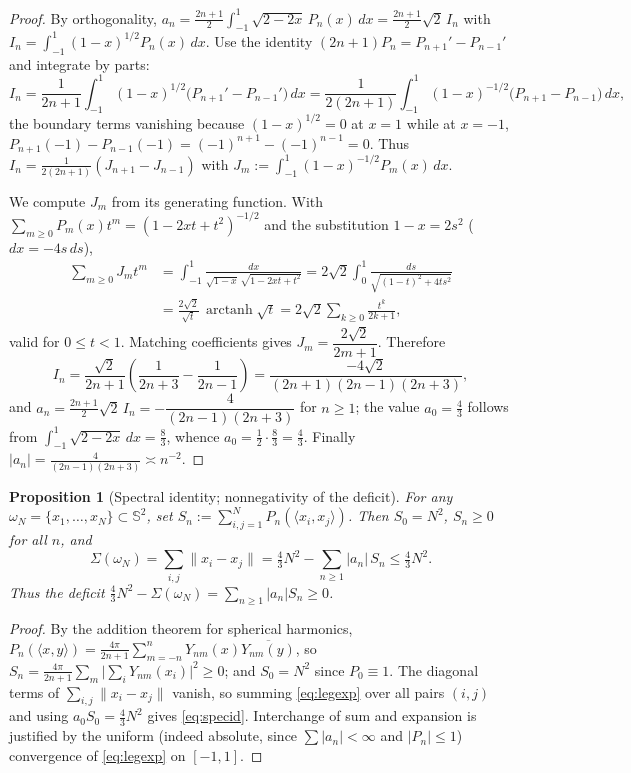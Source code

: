 \documentclass[11pt,reqno]{amsart}
\newtheorem{proposition}[theorem]{Proposition}
\theoremstyle{definition}
\newcommand{\Sph}{\mathbb{S}^2}
\newcommand{\Leg}{P}                      %
\newcommand{\dist}[2]{\lVert #1-#2\rVert}
\newcommand{\inner}[2]{\langle #1,#2\rangle}
\newcommand{\ol}{\overline}
\newcommand{\abs}[1]{\lvert #1\rvert}
\begin{document}
\begin{proof}
By orthogonality, $a_n=\frac{2n+1}{2}\int_{-1}^1\sqrt{2-2x}\,\Leg_n(x)\,dx=\frac{2n+1}{2}\sqrt2\,I_n$
with $I_n=\int_{-1}^1(1-x)^{1/2}\Leg_n(x)\,dx$. Use the identity
$(2n+1)\Leg_n=\Leg_{n+1}'-\Leg_{n-1}'$ and integrate by parts:
\[
   I_n=\frac{1}{2n+1}\int_{-1}^1(1-x)^{1/2}\bigl(\Leg_{n+1}'-\Leg_{n-1}'\bigr)\,dx
      =\frac{1}{2(2n+1)}\int_{-1}^1(1-x)^{-1/2}\bigl(\Leg_{n+1}-\Leg_{n-1}\bigr)\,dx,
\]
the boundary terms vanishing because $(1-x)^{1/2}=0$ at $x=1$ while at $x=-1$,
$\Leg_{n+1}(-1)-\Leg_{n-1}(-1)=(-1)^{n+1}-(-1)^{n-1}=0$. Thus $I_n=\frac{1}{2(2n+1)}(J_{n+1}-J_{n-1})$
with $J_m:=\int_{-1}^1(1-x)^{-1/2}\Leg_m(x)\,dx$.

We compute $J_m$ from its generating function. With $\sum_{m\ge0}\Leg_m(x)t^m=(1-2xt+t^2)^{-1/2}$
and the substitution $1-x=2s^2$ ($dx=-4s\,ds$),
\begin{align*}
   \sum_{m\ge0}J_m t^m
   &=\int_{-1}^1\frac{dx}{\sqrt{1-x}\,\sqrt{1-2xt+t^2}}
    =2\sqrt2\int_0^1\frac{ds}{\sqrt{(1-t)^2+4ts^2}}\\
   &=\frac{2\sqrt2}{\sqrt t}\,\operatorname{arctanh}\!\sqrt t
    =2\sqrt2\sum_{k\ge0}\frac{t^k}{2k+1},
\end{align*}
valid for $0\le t<1$. Matching coefficients gives $J_m=\dfrac{2\sqrt2}{2m+1}$. Therefore
\[
   I_n=\frac{\sqrt2}{2n+1}\left(\frac{1}{2n+3}-\frac{1}{2n-1}\right)
      =\frac{-4\sqrt2}{(2n+1)(2n-1)(2n+3)},
\]
and $a_n=\frac{2n+1}{2}\sqrt2\,I_n=-\dfrac{4}{(2n-1)(2n+3)}$ for $n\ge1$; the value $a_0=\frac43$
follows from $\int_{-1}^1\sqrt{2-2x}\,dx=\frac83$, whence
$a_0=\frac12\cdot\frac{8}{3}=\frac43$. Finally
$\abs{a_n}=\frac{4}{(2n-1)(2n+3)}\asymp n^{-2}$.
\end{proof}

\begin{proposition}[Spectral identity; nonnegativity of the deficit]\label{prop:spectral}
For any $\omega_N=\{x_1,\dots,x_N\}\subset\Sph$, set
$S_n:=\sum_{i,j=1}^N\Leg_n(\inner{x_i}{x_j})$. Then $S_0=N^2$, $S_n\ge0$ for all $n$, and
\begin{equation}\label{eq:specid}
   \Sigma(\omega_N)=\sum_{i,j}\dist{x_i}{x_j}
   =\tfrac43N^2-\sum_{n\ge1}\abs{a_n}\,S_n
   \le\tfrac43N^2 .
\end{equation}
Thus the deficit $\tfrac43N^2-\Sigma(\omega_N)=\sum_{n\ge1}\abs{a_n}S_n\ge0$.
\end{proposition}

\begin{proof}
By the addition theorem for spherical harmonics,
$\Leg_n(\inner{x}{y})=\frac{4\pi}{2n+1}\sum_{m=-n}^{n}Y_{nm}(x)\ol{Y_{nm}(y)}$, so
$S_n=\frac{4\pi}{2n+1}\sum_m\bigl\lvert\sum_i Y_{nm}(x_i)\bigr\rvert^2\ge0$; and $S_0=N^2$ since
$\Leg_0\equiv1$. The diagonal terms of $\sum_{i,j}\dist{x_i}{x_j}$ vanish, so summing
\eqref{eq:legexp} over all pairs $(i,j)$ and using $a_0S_0=\frac43N^2$ gives \eqref{eq:specid}.
Interchange of sum and expansion is justified by the uniform (indeed absolute, since
$\sum\abs{a_n}<\infty$ and $\abs{\Leg_n}\le1$) convergence of \eqref{eq:legexp} on $[-1,1]$.
\end{proof}
\end{document}
